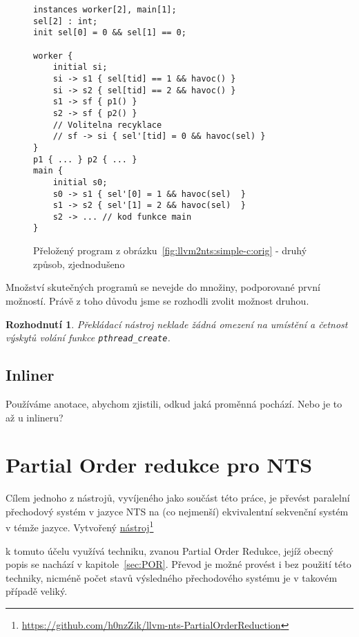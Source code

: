 \documentclass{fithesis2}
\newtheorem{decision}  {Rozhodnutí}
\newcommand\fnurl[2]{%
  \href{#2}{#1}\footnote{\url{#2}}%
}
\begin{document}
\begin{figure}[t]
\begin{lstlisting}
instances worker[2], main[1];
sel[2] : int;
init sel[0] = 0 && sel[1] == 0;

worker {
	initial si;
	si -> s1 { sel[tid] == 1 && havoc() }
	si -> s2 { sel[tid] == 2 && havoc() }
	s1 -> sf { p1() }
	s2 -> sf { p2() }
	// Volitelna recyklace
	// sf -> si { sel'[tid] = 0 && havoc(sel) }
}
p1 { ... } p2 { ... }
main {
	initial s0;
	s0 -> s1 { sel'[0] = 1 && havoc(sel)  }
	s1 -> s2 { sel'[1] = 2 && havoc(sel)  }
	s2 -> ... // kod funkce main
}
\end{lstlisting}
\caption{Přeložený program z obrázku~\ref{fig:llvm2nts:simple-c:orig} - druhý způsob, zjednodušeno}
\label{fig:llvm2nts:simple-c:realworld-nts}
\end{figure}


Množství skutečných programů se nevejde do množiny, podporované první možností. Právě z toho důvodu jsme se rozhodli zvolit možnost druhou.

\begin{decision}\label{decision:real-world-programs}
Překládací nástroj neklade žádná omezení na umístění a četnost výskytů volání funkce \texttt{pthread\_create}.
\end{decision}

\section{Inliner}
Používáme anotace, abychom zjistili, odkud jaká proměnná pochází. Nebo je to až u inlineru?




\chapter{Partial Order redukce pro NTS}
\label{sec:nts-por}
Cílem jednoho z nástrojů, vyvíjeného jako součást této práce, je převést paralelní přechodový systém v jazyce NTS na (co nejmenší) ekvivalentní sekvenční systém v témže jazyce. Vytvořený
\fnurl{nástroj}{https://github.com/h0nzZik/llvm-nts-PartialOrderReduction}
k tomuto účelu využívá techniku, zvanou Partial Order Redukce, jejíž obecný popis se nachází v kapitole~\ref{sec:POR}. Převod je možné provést i bez použití této techniky, nicméně počet stavů výsledného přechodového systému je v takovém případě veliký.
\end{document}
